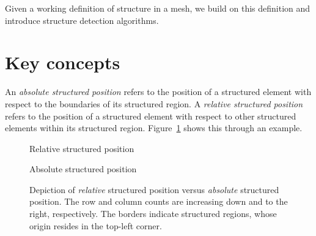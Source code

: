 \label{chap:rectangle-growth}
Given a working definition of structure in a mesh, we build on this definition and introduce structure detection algorithms.

\section{Key concepts}
An \emph{absolute structured position} refers to the position of a structured element with respect to the boundaries of its structured region.
A \emph{relative structured position} refers to the position of a structured element with respect to other structured elements within its structured region. Figure~\ref{fig:structured-position} shows this through an example.


\begin{figure}
\newcommand{\nodesize}{1.2}
\newcommand{\rows}{4}
\newcommand{\cols}{4}
\newcommand{\rowsize}{\rows*\nodesize}
\newcommand{\colsize}{\cols*\nodesize+2*0.1}

\newcommand{\nodeat}[3]{
	\pgfmathsetmacro{\lerow}{ (\rows - #1) * \nodesize - (\nodesize / 2) - 0.1}
	\pgfmathsetmacro{\lecol}{ (#2 * \nodesize) + (\nodesize / 2) + 0.1}
	\node at (\lecol, \lerow) {#3}
}

\sidebyside
{
	\caption{Relative structured position\label{fig:relative-structured-position}}
}
{
	\caption{Absolute structured position\label{fig:absolute-structured-position}}
}
\caption{Depiction of \emph{relative} structured position versus \emph{absolute} structured position. The row and column counts are increasing down and to the right, respectively. The borders indicate structured regions, whose origin resides in the top-left corner.\label{fig:structured-position}}
\end{figure}



